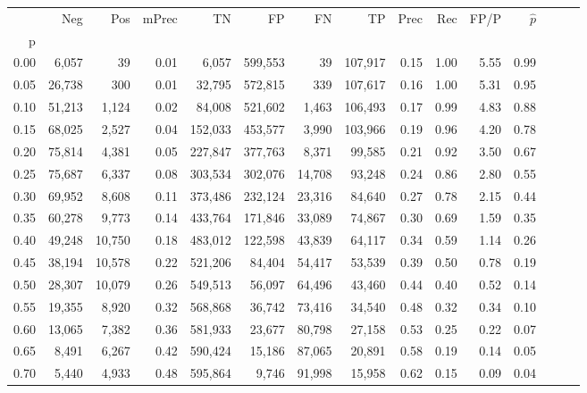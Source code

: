 \begin{tabular}{rrrrrrrrrrrrrrr}
\toprule
{} &     Neg &     Pos & mPrec &       TN &       FP &       FN &       TP &  Prec &   Rec &  FP/P & $\hat{p}$ \\
p    &         &         &       &          &          &          &          &       &       &       &           \\
\midrule
0.00 &   6,057 &      39 &  0.01 &    6,057 &  599,553 &       39 &  107,917 &  0.15 &  1.00 &  5.55 &      0.99 \\
0.05 &  26,738 &     300 &  0.01 &   32,795 &  572,815 &      339 &  107,617 &  0.16 &  1.00 &  5.31 &      0.95 \\
0.10 &  51,213 &   1,124 &  0.02 &   84,008 &  521,602 &    1,463 &  106,493 &  0.17 &  0.99 &  4.83 &      0.88 \\
0.15 &  68,025 &   2,527 &  0.04 &  152,033 &  453,577 &    3,990 &  103,966 &  0.19 &  0.96 &  4.20 &      0.78 \\
0.20 &  75,814 &   4,381 &  0.05 &  227,847 &  377,763 &    8,371 &   99,585 &  0.21 &  0.92 &  3.50 &      0.67 \\
0.25 &  75,687 &   6,337 &  0.08 &  303,534 &  302,076 &   14,708 &   93,248 &  0.24 &  0.86 &  2.80 &      0.55 \\
0.30 &  69,952 &   8,608 &  0.11 &  373,486 &  232,124 &   23,316 &   84,640 &  0.27 &  0.78 &  2.15 &      0.44 \\
0.35 &  60,278 &   9,773 &  0.14 &  433,764 &  171,846 &   33,089 &   74,867 &  0.30 &  0.69 &  1.59 &      0.35 \\
0.40 &  49,248 &  10,750 &  0.18 &  483,012 &  122,598 &   43,839 &   64,117 &  0.34 &  0.59 &  1.14 &      0.26 \\
0.45 &  38,194 &  10,578 &  0.22 &  521,206 &   84,404 &   54,417 &   53,539 &  0.39 &  0.50 &  0.78 &      0.19 \\
0.50 &  28,307 &  10,079 &  0.26 &  549,513 &   56,097 &   64,496 &   43,460 &  0.44 &  0.40 &  0.52 &      0.14 \\
0.55 &  19,355 &   8,920 &  0.32 &  568,868 &   36,742 &   73,416 &   34,540 &  0.48 &  0.32 &  0.34 &      0.10 \\
0.60 &  13,065 &   7,382 &  0.36 &  581,933 &   23,677 &   80,798 &   27,158 &  0.53 &  0.25 &  0.22 &      0.07 \\
0.65 &   8,491 &   6,267 &  0.42 &  590,424 &   15,186 &   87,065 &   20,891 &  0.58 &  0.19 &  0.14 &      0.05 \\
0.70 &   5,440 &   4,933 &  0.48 &  595,864 &    9,746 &   91,998 &   15,958 &  0.62 &  0.15 &  0.09 &      0.04 \\

\end{tabular}
